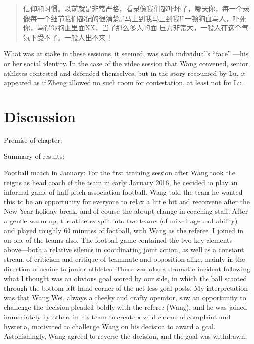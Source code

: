 \begin{CJK}{UTF8}{gbsn}
  \begin{quotation}
      信仰和习惯。以前就是非常严格，看录像我们都吓坏了，哪天你，每一个录像每一个细节我们都记的很清楚。'马上到我马上到我!''一顿狗血骂人，吓死你，骂得你狗血里面XX，当了那么多人的面 压力非常大，一般人在这个气氛下受不了。一般人出不来！
  \end{quotation}


What was at stake in these sessions, it seemed, was each individual's ``face'' ---his or her social identity.  In the case of the video session that Wang convened, senior athletes contested and defended themselves, but in the story recounted by Lu, it appeared as if Zheng allowed no such room for contestation, at least not for Lu.




  \section{Discussion}

Premise of chapter:

Summary of results:



Football match in January:
  For the first training session after Wang took the reigns as head coach of the team in early January 2016, he decided to play an informal game of half-pitch association football.  Wang told the team he wanted this to be an opportunity for everyone to relax a little bit and reconvene after the New Year holiday break, and of course the abrupt change in coaching staff. After a gentle warm up, the athletes split into two teams (of mixed age and ability) and played roughly 60 minutes of football, with Wang as the referee.  I joined in on one of the teams also.  The football game contained the two key elements above---both a relative silence in coordinating joint action, as well as a constant stream of criticism and critique of teammate and opposition alike, mainly in the direction of senior to junior athletes.  There was also a dramatic incident following what I thought was an obvious goal scored by our side, in which the ball scooted through the bottom left hand corner of the net-less goal posts. My interpretation was that Wang Wei, always a cheeky and crafty operator, saw an opportunity to challenge the decision  pleaded boldly with the referee (Wang), and he was joined immediately by others in his team to create a wild chorus of complaint and hysteria, motivated to challenge Wang on his decision to award a goal.  Astonishingly, Wang agreed to reverse the decision, and the goal was withdrawn.


\end{CJK}
